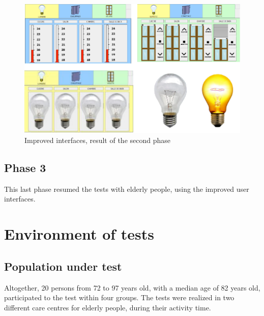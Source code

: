 \begin{figure}[h!]
\includegraphics[width=\textwidth]{part4/pics/PhaseTwoInterfaces}
\caption{Improved interfaces, result of the second phase}
\label{fig:phaseTwoInterfaces}
\end{figure}

\subsection{Phase 3}
This last phase resumed the tests with elderly people, using the improved user interfaces. 

\section{Environment of tests}

\subsection{Population under test}
Altogether, 20 persons from 72 to 97 years old, with a median age of 82 years old, participated to the test within four groups. The tests were realized in two different care centres for elderly people, during their activity time.\\

